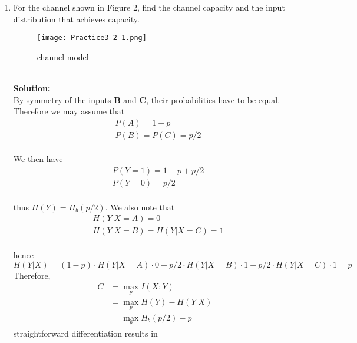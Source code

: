 \documentclass[a4paper,12pt]{article}
\begin{document}
\begin{enumerate}
\begin{flushright}
            \end{flushright}
        \item
            For the channel shown in Figure 2, find the channel capacity and the input distribution that achieves capacity. 
            \begin{figure}[h]
            	\centering
            	\texttt{[image: Practice3-2-1.png]}
            	\caption{channel model}
            \end{figure} \\ 
            \textbf{Solution:} \\
            By symmetry of the inputs \textbf{B} and \textbf{C}, their probabilities have to be equal. Therefore we may assume that 
            $$ 
            \begin{aligned}
                & P(A) = 1 - p \\
                & P(B) = P(C) = p/2
            \end{aligned}
            $$ \\
            We then have 
            $$ 
            \begin{aligned}
                & P(Y = 1) = 1 - p + p/2 \\
                & P(Y = 0) = p/2
            \end{aligned}
            $$ \\
            thus $H(Y) = H_b(p/2)$. We also note that 
            $$ 
            \begin{aligned}
                & H(Y|X = A) = 0 \\
                & H(Y|X = B) = H(Y|X = C) = 1
            \end{aligned}
            $$ \\
            hence $$H(Y|X) = (1 - p) \cdot H(Y|X = A) \cdot 0 + p/2 \cdot H(Y|X = B) \cdot 1 + p/2 \cdot H(Y|X = C) \cdot 1 = p$$
            Therefore, 
            \begin{align*}
                C &= \max_{p} I(X;Y) \\
                  &= \max_{p} H(Y) - H(Y|X) \\
                  &= \max_{p} H_b(p/2) - p
            \end{align*}
            straightforward differentiation results in 

\end{enumerate}
\end{document}
